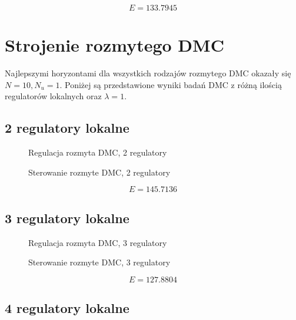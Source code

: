 \begin{equation}
    E = \num{133,7945}
\end{equation}


\section{Strojenie rozmytego DMC}

Najlepszymi horyzontami dla wszystkich rodzajów rozmytego DMC okazały się $N = 10, N_u = 1$. Poniżej są przedstawione wyniki badań DMC z różną ilością regulatorów lokalnych oraz $\lambda = 1$.

\subsection{2 regulatory lokalne}

\begin{figure}[H]
\centering

\caption{Regulacja rozmyta DMC, 2 regulatory}
\end{figure}

\begin{figure}[H]
\centering

\caption{Sterowanie rozmyte DMC, 2 regulatory}
\end{figure}

\begin{equation}
    E = \num{145,7136}
\end{equation}

\subsection{3 regulatory lokalne}

\begin{figure}[H]
\centering

\caption{Regulacja rozmyta DMC, 3 regulatory}
\end{figure}

\begin{figure}[H]
\centering

\caption{Sterowanie rozmyte DMC, 3 regulatory}
\end{figure}

\begin{equation}
    E = \num{127,8804}
\end{equation}

\subsection{4 regulatory lokalne}

